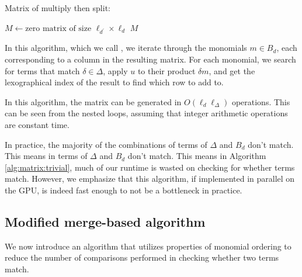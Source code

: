 \begin{algorithm}[H]
    \caption{Matrix of multiply then split: \triv}
    \label{alg:matrix:trivial}
    $M \gets \text{zero matrix of size } \ell_{d^\prime} \times \ell_d $\;
    \Return $M$
\end{algorithm}

In this algorithm, which we call \triv, we iterate through 
the monomials $m \in B_{d}$, each corresponding to a column in the
resulting matrix. For each monomial, we search for terms 
that match $\delta \in \Delta$, apply $u$ to their product $\delta m$, and 
get the lexographical index of the result to find which 
row to add to.

In this algorithm, the matrix can be generated in 
$O(\ell_{d}\ell_{\Delta})$ operations. 
This can be
seen from the nested loops, assuming that integer 
arithmetic operations are constant time.

In practice, the majority of the combinations of 
terms of $\Delta$ and $B_{d}$ don't match. This means in
terms of $\Delta$ and $B_{d}$ don't match. This means in
Algorithm \ref{alg:matrix:trivial}, much of our 
runtime is wasted on checking for whether terms match.
However, we emphasize that this algorithm, if 
implemented in parallel on the GPU, is indeed
fast enough to not be a bottleneck in practice.

\subsection{Modified merge-based algorithm}

We now introduce an algorithm that utilizes 
properties of monomial ordering to reduce the 
number of comparisons 
performed in checking whether two terms match.

